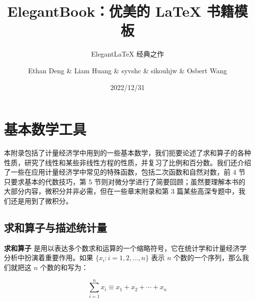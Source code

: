 \documentclass[lang=cn,newtx,10pt,scheme=chinese]{elegantbook}
\title{ElegantBook：优美的 \LaTeX{} 书籍模板}
\subtitle{Elegant\LaTeX{} 经典之作}
\author{Ethan Deng \& Liam Huang \& syvshc \& sikouhjw \& Osbert Wang}
\institute{Elegant\LaTeX{} Program}
\date{2022/12/31}
\begin{document}
\maketitle
\frontmatter

\tableofcontents

\mainmatter















\printbibliography[heading=bibintoc, title=\ebibname]
\appendix

\chapter{基本数学工具}


本附录包括了计量经济学中用到的一些基本数学，我们扼要论述了求和算子的各种性质，研究了线性和某些非线性方程的性质，并复习了比例和百分数。我们还介绍了一些在应用计量经济学中常见的特殊函数，包括二次函数和自然对数，前 4 节只要求基本的代数技巧，第 5 节则对微分学进行了简要回顾；虽然要理解本书的大部分内容，微积分并非必需，但在一些章末附录和第 3 篇某些高深专题中，我们还是用到了微积分。

\section{求和算子与描述统计量}

\textbf{求和算子} 是用以表达多个数求和运算的一个缩略符号，它在统计学和计量经济学分析中扮演着重要作用。如果 $\{x_i: i=1, 2, \ldots, n\}$ 表示 $n$ 个数的一个序列，那么我们就把这 $n$ 个数的和写为：

\begin{equation}
\sum_{i=1}^n x_i \equiv x_1 + x_2 +\cdots + x_n
\end{equation}
\end{document}
